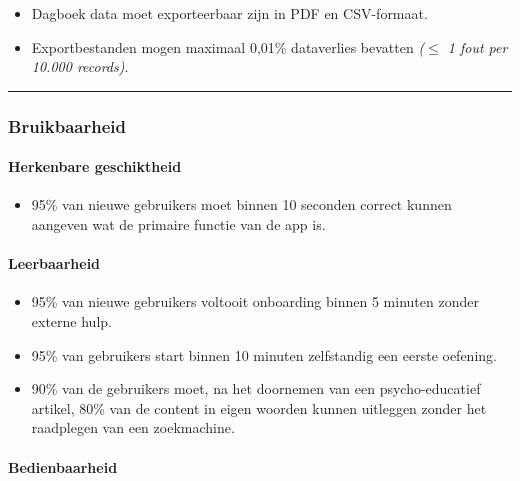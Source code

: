 \begin{itemize}
    \item Dagboek data moet exporteerbaar zijn in PDF en CSV-formaat.
    \item Exportbestanden mogen maximaal 0,01\% dataverlies bevatten \textit{($\leq$ 1 fout per 10.000 records)}.
\end{itemize}

\vspace{1em}
\vspace{1em}
\hrule
\vspace{1em}

\subsubsection{Bruikbaarheid}
\label{subsubsec:bruikbaarheid}

\vspace{1em}

\paragraph{Herkenbare geschiktheid}
\vspace{1em}

\begin{itemize}
    \item 95\% van nieuwe gebruikers moet binnen 10 seconden correct kunnen aangeven wat de primaire functie van de app is.
\end{itemize}

\paragraph{Leerbaarheid}
\vspace{1em}

\begin{itemize}
    \item 95\% van nieuwe gebruikers voltooit onboarding binnen 5 minuten zonder externe hulp.
    \item 95\% van gebruikers start binnen 10 minuten zelfstandig een eerste oefening.
    \item 90\% van de gebruikers moet, na het doornemen van een psycho-educatief artikel, 80\% van de content in eigen woorden kunnen uitleggen zonder het raadplegen van een zoekmachine.
\end{itemize}

\paragraph{Bedienbaarheid}
\vspace{1em}


